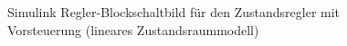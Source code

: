 \begin{figure}[H]
    \centering
    \caption[Zustandsregler mit Vorsteuerung Simulink (linear)]{Simulink Regler-Blockschaltbild für den Zustandsregler mit Vorsteuerung (lineares Zustandsraummodell)}
    \label{fig:Bild15}
\end{figure}

